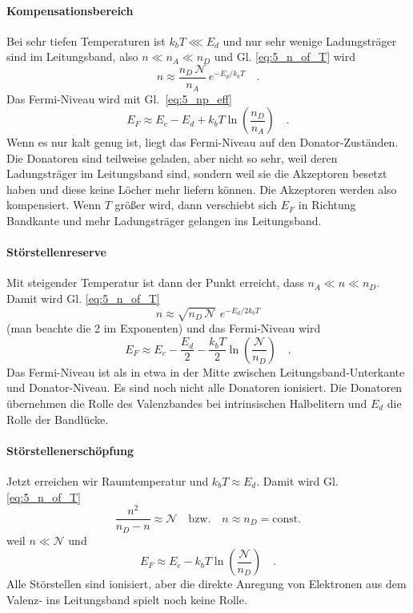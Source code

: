 \paragraph*{Kompensationsbereich} Bei sehr tiefen Temperaturen ist $k_b T \lll E_d$ und nur sehr wenige Ladungsträger sind im Leitungsband, also $n \ll n_A \ll n_D$ und Gl. \ref{eq:5_n_of_T} wird
\begin{equation}
    n  \approx \frac{n_D \, \mathcal{N}}{n_A}  \, e^{- E_d / k_b T}  \quad .
\end{equation}
Das Fermi-Niveau wird mit Gl.~\ref{eq:5_np_eff}
\begin{equation}
    E_F \approx E_c - E_d + k_b T \ln \left( \frac{n_D}{n_A} \right) \quad .
\end{equation}
Wenn es nur kalt genug ist, liegt das Fermi-Niveau auf den Donator-Zuständen. Die Donatoren sind teilweise geladen, aber nicht so sehr, weil deren Ladungsträger im Leitungsband sind, sondern weil sie die Akzeptoren besetzt haben und diese keine Löcher mehr liefern können. Die Akzeptoren werden also kompensiert. Wenn $T$ größer wird, dann verschiebt sich $E_F$ in Richtung Bandkante und mehr Ladungsträger gelangen ins Leitungsband.

\paragraph*{Störstellenreserve} Mit steigender Temperatur ist dann der Punkt erreicht, dass $n_A \ll n \ll n_D$. Damit wird   Gl. \ref{eq:5_n_of_T} 
\begin{equation}
    n \approx \sqrt{n_D \, \mathcal{N}} \,  \, e^{- E_d / 2 k_b T} 
\end{equation}
(man beachte die 2 im Exponenten) und das Fermi-Niveau wird 
\begin{equation}
    E_F \approx E_c - \frac{E_d}{2} - \frac{k_b T}{2} \ln \left( \frac{\mathcal{N}}{n_D} \right)  \quad .
\end{equation}
Das Fermi-Niveau ist als in etwa in der Mitte zwischen Leitungsband-Unterkante und Donator-Niveau. Es sind noch nicht alle Donatoren ionisiert. Die Donatoren übernehmen die Rolle des Valenzbandes bei intrinsischen Halbelitern und $E_d$ die Rolle der Bandlücke.

\paragraph*{Störstellenerschöpfung} Jetzt erreichen wir Raumtemperatur und $k_b T \approx E_d$. Damit wird Gl. \ref{eq:5_n_of_T} 
\begin{equation}
    \frac{n^2}{n_D - n} \approx \mathcal{N}  \quad \text{bzw.} \quad n \approx n_D = \text{const.}
\end{equation}
weil $n \ll  \mathcal{N}$ und 
\begin{equation}
    E_F \approx E_c - k_b T \ln \left( \frac{\mathcal{N}}{n_D} \right) \quad .  \label{eq:5_ef_stoerstellenerschoepfung}
\end{equation}
Alle Störstellen sind ionisiert, aber die direkte Anregung von Elektronen aus dem Valenz- ins Leitungsband spielt noch keine Rolle.

